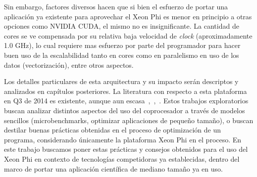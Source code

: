 Sin embargo, factores diversos hacen que si bien el esfuerzo de portar una aplicaci\'on ya existente para aprovechar el Xeon Phi es menor en principio
a otras opciones como NVIDIA CUDA, el mismo no es insignificante. La cantidad de cores se ve compensada por su relativa baja velocidad de \textit{clock}
(aproximadamente 1.0 GHz), lo cual requiere mas esfuerzo por parte del programador para hacer buen uso de la escalabilidad tanto en cores como en
paralelismo en uso de los datos (vectorizaci\'on), entre otros aspectos.~\cite{IntelXeonPhiWhitePaper}

Los detalles particulares de esta arquitectura y su impacto ser\'an descriptos y analizados en cap\'itulos posteriores.
La literatura con respecto a esta plataforma en Q3 de 2014 es existente, aunque aun escasa~\cite{Fang},~\cite{Pennycook},~\cite{Mielikainen}. Estos trabajos
exploratorios buscan analizar distintos aspectos del uso del coprocesador a trav\'es de  modelos sencillos (microbenchmarks, optimizar aplicaciones de peque\~no tama\~no), o buscan destilar buenas pr\'acticas obtenidas en el proceso de optimizaci\'on de un programa, considerando \'unicamente la plataforma Xeon Phi en el proceso. En este trabajo buscamos poner estas pr\'acticas y consejos obtenidos para el uso del Xeon Phi en contexto de tecnolog\'ias competidoras ya establecidas, dentro del marco de portar una aplicaci\'on cient\'ifica de mediano tama\~no ya en uso.
